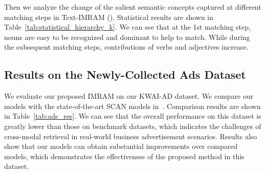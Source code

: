 \documentclass[10pt,twocolumn,letterpaper]{article}
\newcommand{\Ads}{KWAI-AD}
\begin{document}
Then we analyze the change of the salient semantic concepts captured at different matching steps in Text-IMRAM (). Statistical results are shown in Table~\ref{tab:statistical_hierarchy_k}. We can see that at the 1st matching step, nouns are easy to be recognized and dominant to help to match. While during the subsequent matching steps, contributions of verbs and adjectives increase.

\begin{table}
\centering
\caption{Results on the Ads dataset.}
\label{tab:ads_res}
\end{table}


\subsection{Results on the Newly-Collected Ads Dataset}
We evaluate our proposed IMRAM on our \Ads{} dataset. We compare our models with the state-of-the-art SCAN models in~\cite{lee2018stacked}. Comparison results are shown in Table~\ref{tab:ads_res}. We can see that the overall performance on this dataset is greatly lower than those on benchmark datasets, which indicates the challenges of cross-modal retrieval in real-world business advertisement scenarios. Results also show that our models can obtain substantial improvements over compared models, which demonstrates the effectiveness of the proposed method in this dataset.
\end{document}
